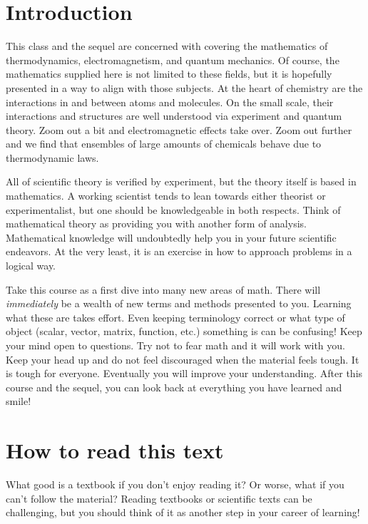     \section{Introduction}
    
    This class and the sequel are concerned with covering the mathematics of thermodynamics, electromagnetism, and quantum mechanics. Of course, the mathematics supplied here is not limited to these fields, but it is hopefully presented in a way to align with those subjects.  At the heart of chemistry are the interactions in and between atoms and molecules. On the small scale, their interactions and structures are well understood via experiment and quantum theory. Zoom out a bit and electromagnetic effects take over. Zoom out further and we find that ensembles of large amounts of chemicals behave due to thermodynamic laws.  
    
    All of scientific theory is verified by experiment, but the theory itself is based in mathematics. A working scientist tends to lean towards either theorist or experimentalist, but one should be knowledgeable in both respects.  Think of mathematical theory as providing you with another form of analysis.  Mathematical knowledge will undoubtedly help you in your future scientific endeavors.  At the very least, it is an exercise in how to approach problems in a logical way.
    
    Take this course as a first dive into many new areas of math.  There will \emph{immediately} be a wealth of new terms and methods presented to you.  Learning what these are takes effort.  Even keeping terminology correct or what type of object (scalar, vector, matrix, function, etc.) something is can be confusing! Keep your mind open to questions.  Try not to fear math and it will work with you. Keep your head up and do not feel discouraged when the material feels tough.  It is tough for everyone.  Eventually you will improve your understanding. After this course and the sequel, you can look back at everything you have learned and smile!
    
    
    \section{How to read this text}
    
    What good is a textbook if you don't enjoy reading it? Or worse, what if you can't follow the material? Reading textbooks or scientific texts can be challenging, but you should think of it as another step in your career of learning!\\
    
